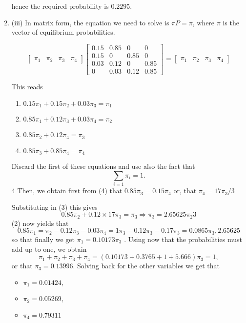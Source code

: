\documentclass[a4paper,12pt]{article}
\begin{document}
\begin{enumerate}
hence the required probability is $0.229$5.
\item (iii)
In matrix form, the equation we need to solve is $\pi P = \pi$,
where $\pi$ is the vector of equilibrium probabilities.

\[ \begin{bmatrix}
\pi_1& \pi_2 & \pi_3 & \pi_4 
\end{bmatrix}\begin{bmatrix}
0.15 & 0.85 & 0 & 0 \\
0.15 & 0 & 0.85 & 0 \\
0.03 & 0.12 & 0 & 0.85 \\
0 & 0.03 & 0.12 & 0.85 
\end{bmatrix} = \begin{bmatrix}
\pi_1& \pi_2 & \pi_3 & \pi_4 
\end{bmatrix}  \]

This reads
\begin{enumerate}[(1)]
\item ${ \displaystyle 0.15 \pi_1 + 0.15 \pi_2 + 0.03 \pi_3 = \pi_1 }$
\item ${ \displaystyle 0.85 \pi_1 + 0.12 \pi_3 + 0.03 \pi_4 = \pi_2 }$
\item ${ \displaystyle 0.85 \pi_2 + 0.12 \pi_4 = \pi_3 }$
\item ${ \displaystyle  0.85 \pi_3 + 0.85 \pi_4 = \pi_4 }$
\end{enumerate}
Discard the first of these equations and use also the fact that
\[\sum_{i= 1} \pi_i = 1 .\]
4
Then, we obtain first from (4) that $0.85 \pi_3 = 0.15 \pi_4$
or, that $\pi_4 = 17 \pi_3 / 3$

Substituting in (3) this gives
\[0.85 \pi_2 + 0.12 ×
17
\pi_3 = \pi_3 ⇒ \pi_3 = 2.65625 \pi_2
3\]
(2) now yields that
\[0.85 \pi_1 = \pi_2 − 0.12 \pi_3 − 0.03 \pi_4 =
1
\pi_3 − 0.12 \pi_3 − 0.17 \pi_3 = 0.0865 \pi_3 ,
2.65625\]
so that finally we get $\pi_1 = 0.10173 \pi_3$ .
Using now that the probabilities must add up to one, we obtain
\[ \pi_1 + \pi_2 + \pi_3 + \pi_4 = (0.10173 + 0.3765 + 1 + 5.666) \pi_3 = 1, \]
or that $\pi_3 = 0.13996$.
Solving back for the other variables we get that
\begin{itemize}
    \item $ { \displaystyle \pi_1 = 0.01424}$, 
    \item $ { \displaystyle \pi_2 = 0.05269}$, 
    \item $ { \displaystyle \pi_4 = 0.79311}$
\end{itemize}


\end{enumerate}
\end{document}
